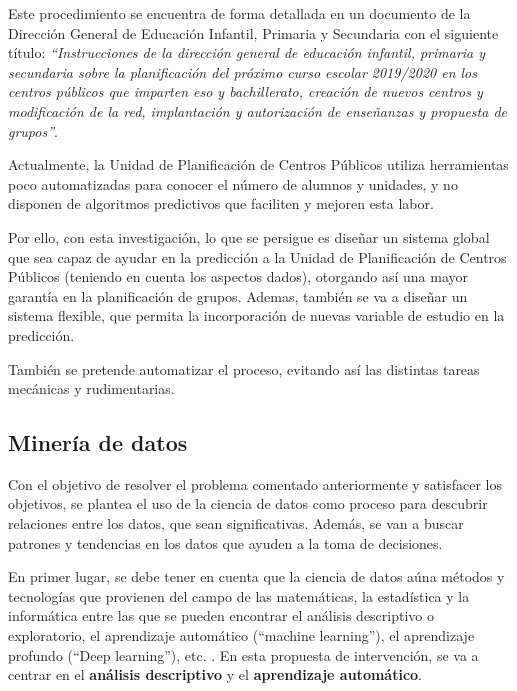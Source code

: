 Este procedimiento se encuentra de forma detallada en un documento de la Dirección General de Educación Infantil, Primaria y Secundaria con el siguiente título: \textit{``Instrucciones de la dirección general de educación infantil, primaria y secundaria sobre la planificación del próximo curso escolar 2019/2020 en los centros públicos que imparten eso y bachillerato, creación de nuevos centros y modificación de la red, implantación y autorización de enseñanzas y propuesta de grupos''}.

Actualmente, la Unidad de Planificación de Centros Públicos utiliza herramientas poco automatizadas para conocer el número de alumnos y unidades, y no disponen de algoritmos predictivos que faciliten y mejoren esta labor.



Por ello, con esta investigación, lo que se persigue es diseñar un sistema global que sea capaz de ayudar en la predicción a la Unidad de Planificación de Centros Públicos (teniendo en cuenta los aspectos dados), otorgando así una mayor garantía en la planificación de grupos. Ademas, también se va a diseñar un sistema flexible, que permita la incorporación de nuevas variable de estudio en la predicción. 

También se pretende automatizar el proceso, evitando así las distintas tareas mecánicas y rudimentarias.




\subsection{Minería de datos}
Con el objetivo de resolver el problema comentado anteriormente y satisfacer los objetivos, se plantea el uso de la ciencia de datos como proceso para descubrir relaciones entre los datos, que sean significativas. Además, se van a buscar patrones y tendencias en los datos que ayuden a la toma de decisiones.

En primer lugar, se debe tener en cuenta que la ciencia de datos aúna métodos y tecnologías que provienen del campo de las matemáticas, la estadística y la informática entre las que se pueden encontrar el análisis descriptivo o exploratorio, el aprendizaje automático (“machine learning”), el aprendizaje profundo (“Deep learning”), etc. \cite{MARIN2018}. En esta propuesta de intervención, se va a centrar en el \textbf{análisis descriptivo} y el \textbf{aprendizaje automático}.

